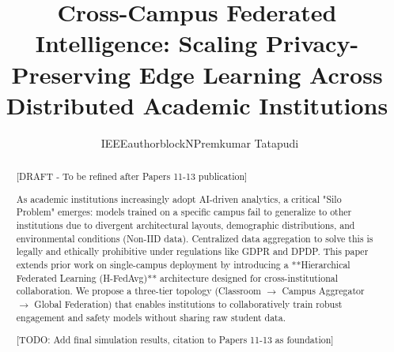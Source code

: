 \documentclass[conference]{IEEEtran}
\begin{document}
\title{Cross-Campus Federated Intelligence: Scaling Privacy-Preserving Edge Learning Across Distributed Academic Institutions}

\author{\ IEEEauthorblockN{Premkumar Tatapudi}
}

\maketitle

%

\begin{abstract}
[DRAFT - To be refined after Papers 11-13 publication]

As academic institutions increasingly adopt AI-driven analytics, a critical "Silo Problem" emerges: models trained on a specific campus fail to generalize to other institutions due to divergent architectural layouts, demographic distributions, and environmental conditions (Non-IID data). Centralized data aggregation to solve this is legally and ethically prohibitive under regulations like GDPR and DPDP. This paper extends prior work on single-campus deployment by introducing a **Hierarchical Federated Learning (H-FedAvg)** architecture designed for cross-institutional collaboration. We propose a three-tier topology (Classroom $\rightarrow$ Campus Aggregator $\rightarrow$ Global Federation) that enables institutions to collaboratively train robust engagement and safety models without sharing raw student data.

[TODO: Add final simulation results, citation to Papers 11-13 as foundation]
\end{abstract}
\end{document}
